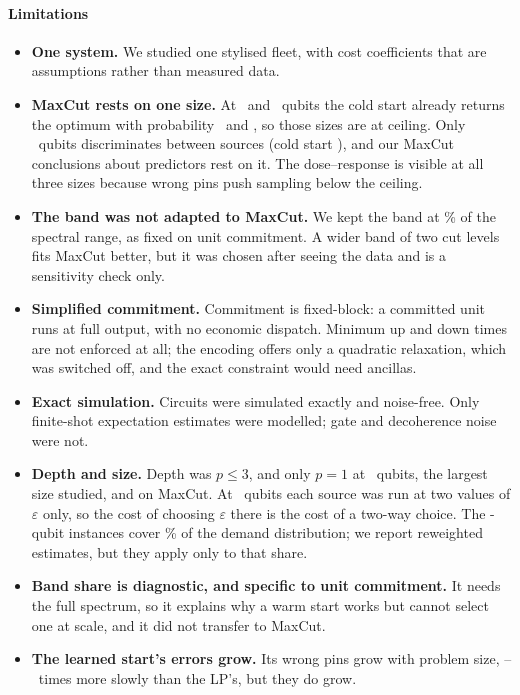 \paragraph{Limitations}
\begin{itemize}
\item \textbf{One system.} We studied one stylised fleet, with cost coefficients that are assumptions rather than measured data.
\item \textbf{MaxCut rests on one size.} At \MCSizeTwelve\ and \MCSizeSixteen\ qubits the cold start already returns the optimum with probability \MCColdTwelve\ and \MCColdSixteen, so those sizes are at ceiling. Only \MCSizeTwenty\ qubits discriminates between sources (cold start \MCColdTwenty), and our MaxCut conclusions about predictors rest on it. The dose--response is visible at all three sizes because wrong pins push sampling below the ceiling.
\item \textbf{The band was not adapted to MaxCut.} We kept the band at \BandFivePct\% of the spectral range, as fixed on unit commitment. A wider band of two cut levels fits MaxCut better, but it was chosen after seeing the data and is a sensitivity check only.
\item \textbf{Simplified commitment.} Commitment is fixed-block: a committed unit runs at full output, with no economic dispatch. Minimum up and down times are not enforced at all; the encoding offers only a quadratic relaxation, which was switched off, and the exact constraint would need ancillas.
\item \textbf{Exact simulation.} Circuits were simulated exactly and noise-free. Only finite-shot expectation estimates were modelled; gate and decoherence noise were not.
\item \textbf{Depth and size.} Depth was $p\leq3$, and only $p=1$ at \NLfour\ qubits, the largest size studied, and on MaxCut. At \NLfour\ qubits each source was run at two values of $\varepsilon$ only, so the cost of choosing $\varepsilon$ there is the cost of a two-way choice. The \NLfour-qubit instances cover \LfourCoverage\% of the demand distribution; we report reweighted estimates, but they apply only to that share.
\item \textbf{Band share is diagnostic, and specific to unit commitment.} It needs the full spectrum, so it explains why a warm start works but cannot select one at scale, and it did not transfer to MaxCut.
\item \textbf{The learned start's errors grow.} Its wrong pins grow with problem size, \SlopeRatioMin--\SlopeRatioMax\ times more slowly than the LP's, but they do grow.
\end{itemize}

